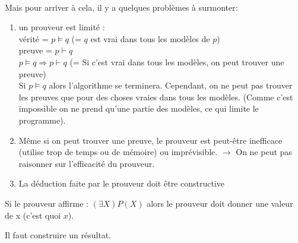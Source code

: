 \paragraph{}
Mais pour arriver à cela, il y a quelques problèmes à surmonter:
\begin{enumerate}\renewcommand {\theenumi }{\alph {enumi}}
	\item un prouveur est limité :\\
		vérité = $ p \models q $ (= $ q $ est vrai dans tous les modèles de $ p $)\\
		preuve = $ p  \vdash q $ \\
		$ p \models q \Rightarrow p \vdash q $ (= Si c’est vrai dans tous les modèles, on peut trouver une preuve)\\
		Si $ p \models q $ alors l’algorithme se terminera. Cependant, on ne peut pas trouver les preuves que pour des choses vraies dans tous les modèles. (Comme c’est impossible on ne prend qu’une partie des modèles, ce qui limite le programme).
		
		\item Même si on peut trouver une preuve, le prouveur est peut-être inefficace (utilise trop de temps ou de mémoire) ou imprévisible. $ \to $ On ne peut pas raisonner sur l’efficacité du prouveur.
		
		\item La déduction faite par le prouveur doit être constructive  
\end{enumerate}

		Si le prouveur affirme : $ (\exists X) P(X) $  alors le prouveur doit donner une valeur de x (c’est quoi $ x $).



Il faut construire un résultat.

